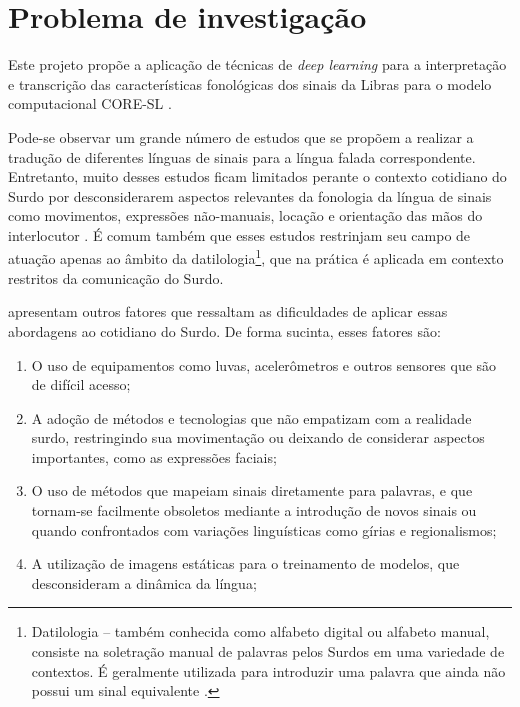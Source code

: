 

\maketitle

\section{Problema de investigação}

Este projeto propõe a aplicação de técnicas de \textit{deep learning} para a interpretação e transcrição das características fonológicas dos sinais da Libras para o modelo computacional CORE-SL \cite{antunes-2015}. 

Pode-se observar um grande número de estudos que se propõem a realizar a tradução de diferentes línguas de sinais para a língua falada correspondente. Entretanto, muito desses estudos ficam limitados perante o contexto cotidiano do Surdo por desconsiderarem aspectos relevantes da fonologia da língua de sinais como movimentos, expressões não-manuais, locação e orientação das mãos do interlocutor \cite{quadros-2004}. É comum também que esses estudos restrinjam seu campo de atuação apenas ao âmbito da datilologia\footnote{
Datilologia – também conhecida como alfabeto digital ou alfabeto manual, consiste na soletração manual de palavras pelos Surdos em uma variedade de contextos. É geralmente utilizada para introduzir uma palavra que ainda não possui um sinal equivalente \cite{quadros-2004}\cite{pereira-choi-2011}.
}, que na prática é aplicada em contexto restritos da comunicação do Surdo.

\textcite{antunes-hcisl-2011} apresentam outros fatores que ressaltam as dificuldades de aplicar essas abordagens ao cotidiano do Surdo. De forma sucinta, esses fatores são: 
\begin{enumerate}
\item O uso de equipamentos como luvas, acelerômetros e outros sensores que são de difícil acesso; 
\item A adoção de métodos e tecnologias que não empatizam com a realidade surdo, restringindo sua movimentação ou deixando de considerar aspectos importantes, como as expressões faciais;
\item O uso de métodos que mapeiam sinais diretamente para palavras, e que tornam-se facilmente obsoletos mediante a introdução de novos sinais ou quando confrontados com variações linguísticas como gírias e regionalismos; 
\item A utilização de imagens estáticas para o treinamento de modelos, que desconsideram a dinâmica da língua; 
\end{enumerate}

